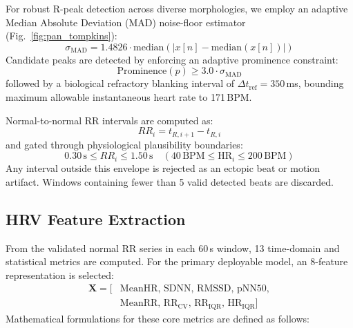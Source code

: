 \documentclass[conference]{IEEEtran}
\begin{document}
For robust R-peak detection across diverse morphologies, we employ an adaptive Median Absolute Deviation (MAD) noise-floor estimator (Fig.~\ref{fig:pan_tompkins}):
\begin{equation}
    \sigma_{\text{MAD}} = 1.4826 \cdot \text{median}\left(\left| x[n] - \text{median}(x[n]) \right|\right)
    \label{eq:mad}
\end{equation}
Candidate peaks are detected by enforcing an adaptive prominence constraint:
\begin{equation}
    \text{Prominence}(p) \ge 3.0 \cdot \sigma_{\text{MAD}}
    \label{eq:prominence}
\end{equation}
followed by a biological refractory blanking interval of $\Delta t_{\text{ref}} = 350$\,ms, bounding maximum allowable instantaneous heart rate to 171\,BPM. 

Normal-to-normal RR intervals are computed as:
\begin{equation}
    RR_i = t_{R, i+1} - t_{R, i}
    \label{eq:rr_interval}
\end{equation}
and gated through physiological plausibility boundaries:
\begin{equation}
    0.30\,\text{s} \le RR_i \le 1.50\,\text{s} \quad (40\,\text{BPM} \le \text{HR}_i \le 200\,\text{BPM})
    \label{eq:rr_gating}
\end{equation}
Any interval outside this envelope is rejected as an ectopic beat or motion artifact. Windows containing fewer than 5 valid detected beats are discarded.

\subsection{HRV Feature Extraction}
From the validated normal RR series in each 60\,s window, 13 time-domain and statistical metrics are computed. For the primary deployable model, an 8-feature representation is selected:
\begin{equation}
\begin{aligned}
    \mathbf{X} = [ & \text{MeanHR},\, \text{SDNN},\, \text{RMSSD},\, \text{pNN50}, \\
                   & \text{MeanRR},\, \text{RR}_{\text{CV}},\, \text{RR}_{\text{IQR}},\, \text{HR}_{\text{IQR}}]
\end{aligned}
\label{eq:feature_vector}
\end{equation}
Mathematical formulations for these core metrics are defined as follows:
\end{document}
